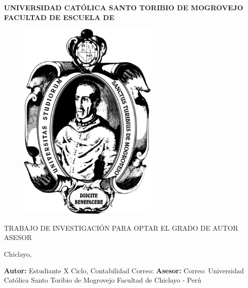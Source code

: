 \pagestyle{empty}
\begin{center}\bf
UNIVERSIDAD CATÓLICA SANTO TORIBIO DE MOGROVEJO\break
FACULTAD DE \MakeUppercase{\Facultad}\break
ESCUELA DE\MakeUppercase{\Escuela}

\begin{figure}[h]
    \centering\includegraphics[height=100mm]{archivos/escudo.png}
\end{figure}

{\large\TituloArticulo}\break\break
TRABAJO DE INVESTIGACIÓN PARA OPTAR EL GRADO DE\break
\MakeUppercase{\GradoArticulo}\break\break
AUTOR\break
{\Autor}\break\break
ASESOR\break
{\Asesor}{\small\break\href{\Orcid}{\textmd{\Orcid}}}\break

Chiclayo,\Fecha
\end{center}
\newpage

\begin{center}
\large\bf\MakeUppercase{\TituloArticulo}
\end{center}

\begin{flushright}
\textbf{Autor:} \Autor
Estudiante X Ciclo, Contabilidad\break
Correo: \AutorEmail\break
\textbf{Asesor:} \Asesor
\Orcid
Correo: \AsesorEmail
Universidad Católica Santo Toribio de Mogrovejo\break
Facultad de \Facultad
\FechaArticulo Chiclayo - Perú
\end{flushright}
